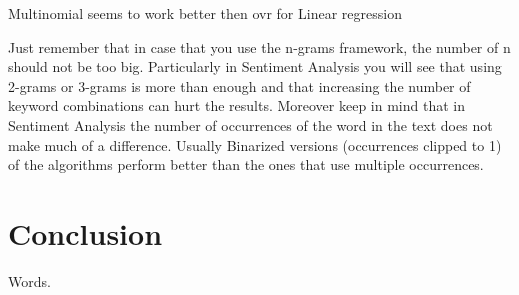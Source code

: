 \documentclass[12pt]{report}
\begin{document}
Multinomial seems to work better then ovr for Linear regression

Just remember that in case that you use the n-grams framework, the number of n should not be too big. Particularly in Sentiment Analysis you will see that using 2-grams or 3-grams is more than enough and that increasing the number of keyword combinations can hurt the results. Moreover keep in mind that in Sentiment Analysis the number of occurrences of the word in the text does not make much of a difference. Usually Binarized versions (occurrences clipped to 1) of the algorithms perform better than the ones that use multiple occurrences.




\newpage

\chapter*{Conclusion}

Words.

\newpage

\end{document}
